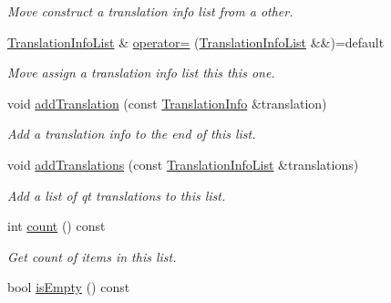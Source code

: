 \begin{DoxyCompactItemize}
\begin{DoxyCompactList}\small\item\em Move construct a translation info list from a other. \end{DoxyCompactList}\item 
\hyperlink{class_mdt_1_1_translation_1_1_translation_info_list}{Translation\+Info\+List} \& \hyperlink{class_mdt_1_1_translation_1_1_translation_info_list_a0d423382cd4d62aef2e8b2f9d416fbb3}{operator=} (\hyperlink{class_mdt_1_1_translation_1_1_translation_info_list}{Translation\+Info\+List} \&\&)=default\hypertarget{class_mdt_1_1_translation_1_1_translation_info_list_a0d423382cd4d62aef2e8b2f9d416fbb3}{}\label{class_mdt_1_1_translation_1_1_translation_info_list_a0d423382cd4d62aef2e8b2f9d416fbb3}

\begin{DoxyCompactList}\small\item\em Move assign a translation info list this this one. \end{DoxyCompactList}\item 
void \hyperlink{class_mdt_1_1_translation_1_1_translation_info_list_a6eca5a31f32a792ece221a96b7bb4494}{add\+Translation} (const \hyperlink{class_mdt_1_1_translation_1_1_translation_info}{Translation\+Info} \&translation)
\begin{DoxyCompactList}\small\item\em Add a translation info to the end of this list. \end{DoxyCompactList}\item 
void \hyperlink{class_mdt_1_1_translation_1_1_translation_info_list_a65b5f7016c17f12ca4574bb02b33c826}{add\+Translations} (const \hyperlink{class_mdt_1_1_translation_1_1_translation_info_list}{Translation\+Info\+List} \&translations)
\begin{DoxyCompactList}\small\item\em Add a list of qt translations to this list. \end{DoxyCompactList}\item 
int \hyperlink{class_mdt_1_1_translation_1_1_translation_info_list_a3f92d9836f426bc6572a37f43c143868}{count} () const \hypertarget{class_mdt_1_1_translation_1_1_translation_info_list_a3f92d9836f426bc6572a37f43c143868}{}\label{class_mdt_1_1_translation_1_1_translation_info_list_a3f92d9836f426bc6572a37f43c143868}

\begin{DoxyCompactList}\small\item\em Get count of items in this list. \end{DoxyCompactList}\item 
bool \hyperlink{class_mdt_1_1_translation_1_1_translation_info_list_a73b66e1c08af3e95aa7183ed698a7682}{is\+Empty} () const \hypertarget{class_mdt_1_1_translation_1_1_translation_info_list_a73b66e1c08af3e95aa7183ed698a7682}{}\label{class_mdt_1_1_translation_1_1_translation_info_list_a73b66e1c08af3e95aa7183ed698a7682}


\end{DoxyCompactItemize}
